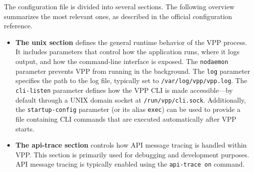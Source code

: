 The configuration file is divided into several sections. The following overview summarizes the most relevant ones, as described in the official configuration reference.~\cite{fdio-config-reference}
\begin{itemize}
  \item \textbf{The unix section} defines the general runtime behavior of the VPP process. 
It includes parameters that control how the application runs, where it logs output, and how the command-line interface is exposed. 
The \texttt{nodaemon} parameter prevents VPP from running in the background. 
The \texttt{log} parameter specifies the path to the log file, typically set to \texttt{/var/log/vpp/vpp.log}. 
The \texttt{cli-listen} parameter defines how the VPP CLI is made accessible—by default through a UNIX domain socket at \texttt{/run/vpp/cli.sock}. 
Additionally, the \texttt{startup-config} parameter (or its alias \texttt{exec}) can be used to provide a file containing CLI commands that are executed automatically after VPP starts.

  \item \textbf{The api-trace section} controls how API message tracing is handled within VPP.  
This section is primarily used for debugging and development purposes. 
API message tracing is typically enabled using the \texttt{api-trace on} command.


\end{itemize}















